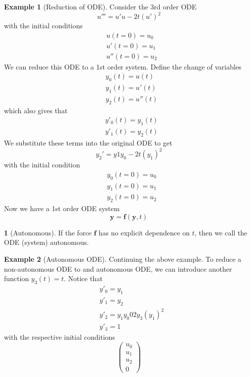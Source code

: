 \documentclass[12pt]{article}
\theoremstyle{definition}
\newtheorem{definition}{\color{NavyBlue}{\textbf{Definition}}}
\newtheorem{example}{\color{WildStrawberry}Example}
\theoremstyle{definition}
\begin{document}
\begin{example}[Reduction of ODE]
	Consider the 3rd order ODE
	\begin{equation}
		u''' = u'u - 2t(u')^2
	\end{equation}
	with the initial conditions
	\begin{align*}
	&u(t=0) = u_0 \\
	&u'(t=0) = u_1 \\
	&u''(t=0) = u_2
	\end{align*}
	We can reduce this ODE to a 1st order system. Define the change of variables
	\begin{align*}
	&y_0(t) = u(t) \\
	&y_1(t) = u'(t) \\
	&y_2(t) = u''(t)
	\end{align*} 
	which also gives that
	\begin{align*}
	&y'_0(t) = y_1(t) \\
	&y'_1(t) = y_2(t)
	\end{align*}
	We substitute these terms into the original ODE to get
	\begin{equation}
		y_2' =y1y_0 - 2t(y_1)^2
	\end{equation}
	with the initial condition
	\begin{align*}
	&y_0(t=0) = u_0 \\
	&y_1(t=0) = u_1 \\
	&y_2(t=0) = u_2
	\end{align*}
	Now we have a 1st order ODE system
	\begin{equation}
		\bm y = \bm f(\bm y, t)
	\end{equation}
\end{example}

\begin{definition}[Autonomous]
	If the force $\bm f$ has no explicit dependence on $t$, then we call the ODE (system) autonomous.
\end{definition}

\begin{example}[Autonomous ODE]
	Continuing the above example. To reduce a non-autonomous ODE to and autonomous ODE, we can introduce another function $y_3(t) = t$. Notice that
	\begin{align*}
	&y'_0 = y_1 \\
	&y'_1 = y_2 \\
	&y'_2 = y_1y_0 0 2y_3(y_1)^2 \\
	&y'_3 = 1
	\end{align*}
	with the respective initial conditions
	\begin{equation}
		\begin{pmatrix}
		u_0 \\ u_1 \\ u_2 \\ 0
		\end{pmatrix}
	\end{equation}
\end{example}
\end{document}
